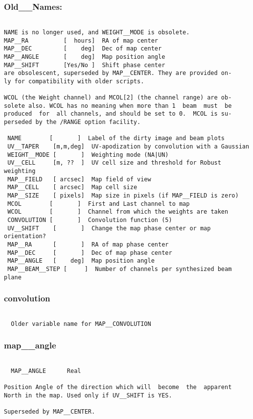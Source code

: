 \subsubsection{Old\_\_Names:}
\begin{verbatim}

NAME is no longer used, and WEIGHT__MODE is obsolete.
MAP__RA          [  hours]  RA of map center
MAP__DEC         [    deg]  Dec of map center
MAP__ANGLE       [    deg]  Map position angle
MAP__SHIFT       [Yes/No ]  Shift phase center
are obsolescent, superseded by MAP__CENTER. They are provided on-
ly for compatibility with older scripts.

WCOL (the Weight channel) and MCOL[2] (the channel range) are ob-
solete also. WCOL has no meaning when more than 1  beam  must  be
produced  for  all channels, and should be set to 0.  MCOL is su-
perseded by the /RANGE option facility.

 NAME        [       ]  Label of the dirty image and beam plots
 UV__TAPER    [m,m,deg]  UV-apodization by convolution with a Gaussian
 WEIGHT__MODE [       ]  Weighting mode (NA|UN)
 UV__CELL     [m, ??  ]  UV cell size and threshold for Robust weighting
 MAP__FIELD   [ arcsec]  Map field of view
 MAP__CELL    [ arcsec]  Map cell size
 MAP__SIZE    [ pixels]  Map size in pixels (if MAP__FIELD is zero)
 MCOL        [       ]  First and Last channel to map
 WCOL        [       ]  Channel from which the weights are taken
 CONVOLUTION [       ]  Convolution function (5)
 UV__SHIFT    [       ]  Change the map phase center or map orientation?
 MAP__RA      [       ]  RA of map phase center
 MAP__DEC     [       ]  Dec of map phase center
 MAP__ANGLE   [    deg]  Map position angle
 MAP__BEAM__STEP [     ]  Number of channels per synthesized beam plane

\end{verbatim}
\subsubsection{convolution}
\begin{verbatim}

  Older variable name for MAP__CONVOLUTION

\end{verbatim}
\subsubsection{map\_\_angle}
\begin{verbatim}

  MAP__ANGLE      Real

Position Angle of the direction which will  become  the  apparent
North in the map. Used only if UV__SHIFT is YES.

Superseded by MAP__CENTER.

\end{verbatim}
